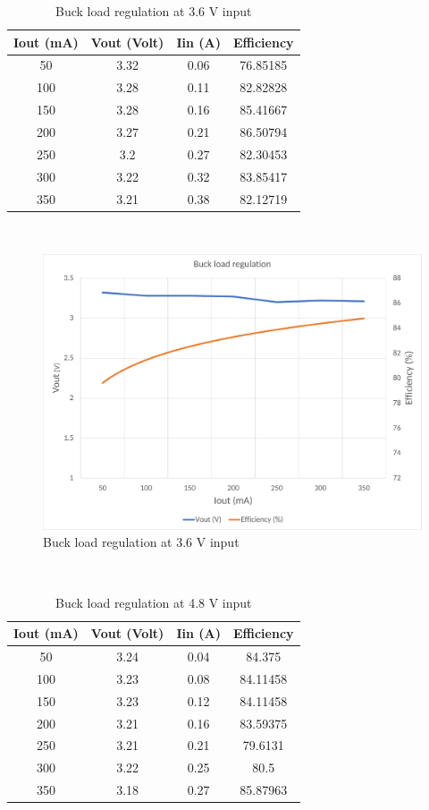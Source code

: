 \begin{table}[H]
\centering
\begin{tabular}{c c c c}
\toprule
Iout (mA) & Vout (Volt) & Iin (A) & Efficiency \\ \midrule\midrule
50        & 3.32        & 0.06    & 76.85185   \\ 
100       & 3.28        & 0.11    & 82.82828   \\ 
150       & 3.28        & 0.16    & 85.41667   \\ 
200       & 3.27        & 0.21    & 86.50794   \\ 
250       & 3.2         & 0.27    & 82.30453   \\ 
300       & 3.22        & 0.32    & 83.85417   \\ 
350       & 3.21        & 0.38    & 82.12719   \\ 
\bottomrule
\end{tabular}
\caption{Buck load regulation at 3.6 V input}
\label{table:4}
\end{table}
\\
\begin{figure}[H]
	\centering
	\includegraphics[width=\columnwidth]{IMGS/Buck load regulation at 3.6V input.pdf}
	\caption{ Buck load regulation at 3.6 V input}
	\label{fig:arch}
\end{figure}
\\
\begin{table}[H]
\centering
\begin{tabular}{c c c c}
\hline
Iout (mA) & Vout (Volt) & Iin (A) & Efficiency \\ \midrule\midrule
50        & 3.24        & 0.04    & 84.375     \\ 
100       & 3.23        & 0.08    & 84.11458   \\ 
150       & 3.23        & 0.12    & 84.11458   \\ 
200       & 3.21        & 0.16    & 83.59375   \\ 
250       & 3.21        & 0.21    & 79.6131    \\ 
300       & 3.22        & 0.25    & 80.5       \\ 
350       & 3.18        & 0.27    & 85.87963   \\ 
\bottomrule
\end{tabular}
\caption{Buck load regulation at 4.8 V input}
\label{table:4}
\end{table}
